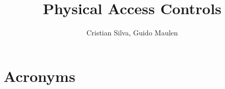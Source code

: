 \documentclass[PMO,authoryear,lsstdraft,toc]{lsstdoc}
\title{Physical Access Controls}
\author{%
Cristian Silva, Guido Maulen
}
\date{\vcsDate}
\begin{document}
\maketitle


\appendix

\section{Acronyms} \label{sec:acronyms}

\end{document}
